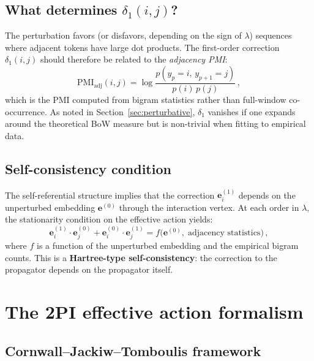 \documentclass[11pt]{article}
\newcommand{\ee}{\bm{e}}
\newcommand{\PMI}{\mathrm{PMI}}
\begin{document}
\subsection{What determines $\delta_1(i,j)$?}

The perturbation favors (or disfavors, depending on the sign of $\lambda$) sequences where adjacent tokens have large dot products. The first-order correction $\delta_1(i,j)$ should therefore be related to the \emph{adjacency PMI}:
\begin{equation}\label{eq:adj-pmi}
    \PMI_{\text{adj}}(i, j) = \log \frac{p(y_p {=} i,\, y_{p+1} {=} j)}{p(i)\, p(j)}\,,
\end{equation}
which is the PMI computed from bigram statistics rather than full-window co-occurrence. As noted in Section~\ref{sec:perturbative}, $\delta_1$ vanishes if one expands around the theoretical BoW measure but is non-trivial when fitting to empirical data.

\subsection{Self-consistency condition}

The self-referential structure implies that the correction $\ee_i^{(1)}$ depends on the unperturbed embedding $\ee^{(0)}$ through the interaction vertex. At each order in $\lambda$, the stationarity condition on the effective action yields:
\begin{equation}\label{eq:self-consistency}
    \ee_i^{(1)} \cdot \ee_j^{(0)} + \ee_i^{(0)} \cdot \ee_j^{(1)} = f\!\big(\ee^{(0)},\; \text{adjacency statistics}\big)\,,
\end{equation}
where $f$ is a function of the unperturbed embedding and the empirical bigram counts. This is a \textbf{Hartree-type self-consistency}: the correction to the propagator depends on the propagator itself.

\section{The 2PI effective action formalism}\label{sec:2PI}

\subsection{Cornwall--Jackiw--Tomboulis framework}
\end{document}
